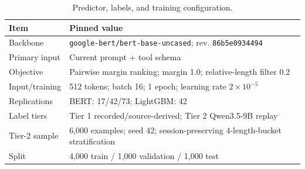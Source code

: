 \begin{table}[!t]
  \centering
  \caption{Predictor, labels, and training configuration.}
  \label{tab:model-config}
  \footnotesize
  \begin{tabularx}{\columnwidth}{@{}lX@{}}
    \toprule
    Item & Pinned value \\
    \midrule
    Backbone & \texttt{google-bert/bert-base-uncased}; rev. \texttt{86b5e0934494} \\
    Primary input & Current prompt + tool schema \\
    Objective & Pairwise margin ranking; margin 1.0; relative-length filter 0.2 \\
    Input/training & 512 tokens; batch 16; 1 epoch; learning rate $2\times10^{-5}$ \\
    Replications & BERT: 17/42/73; LightGBM: 42 \\
    Label tiers & Tier 1 recorded/source-derived; Tier 2 Qwen3.5-9B replay \\
    Tier-2 sample & 6,000 examples; seed 42; session-preserving 4-length-bucket stratification \\
    Split & 4,000 train / 1,000 validation / 1,000 test \\
    \bottomrule
  \end{tabularx}
\end{table}



